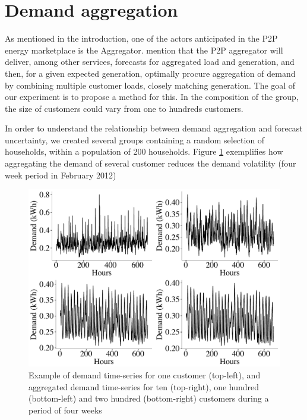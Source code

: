 \documentclass[review, 3p, 12pt, authoryear]{elsarticle}
\begin{document}
\section{Demand aggregation}
\label{sec:load_aggr}
As mentioned in the introduction, one of the actors anticipated in the P2P energy marketplace is the Aggregator. \citet{pouttu2017p2p} mention that the P2P aggregator will deliver, among other services, forecasts for aggregated load and generation, and then, for a given expected generation, optimally procure aggregation of demand by combining multiple customer loads, closely matching generation. The goal of our experiment is to propose a method for this. In the composition of the group, the size of customers could vary from one to hundreds customers.

In order to understand the relationship between demand aggregation and forecast uncertainty, we created several groups containing a random selection of households, within a population of 200 households.
Figure \ref{fig:4weeksaggr} exemplifies how aggregating the demand of several customer reduces the demand volatility (four week period in February 2012)

\begin{figure}
  \centering
  \includegraphics[scale=0.5]{2017-10-13_compare_aggrdemands}
  \caption{Example of demand time-series for one customer (top-left), and aggregated demand time-series for ten (top-right), one hundred (bottom-left) and two hundred (bottom-right) customers during a period of four weeks}
  \label{fig:4weeksaggr}
\end{figure}
\end{document}
